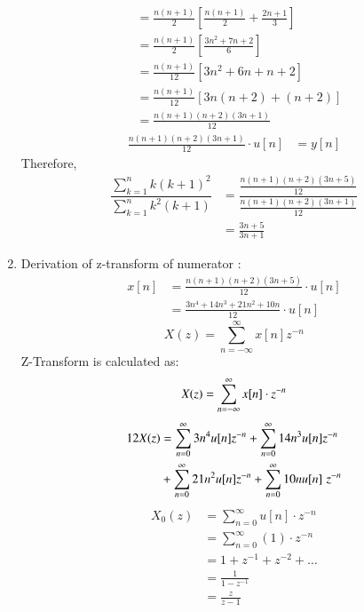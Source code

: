 \documentclass[journal,12pt,twocolumn]{IEEEtran}
\theoremstyle{remark}
\begin{document}
\begin{enumerate}[label=\alph*)]
\begin{align*}
                           &= \frac{n(n+1)}{2}\left[\frac{n(n+1)}{2} +\frac{2n+1}{3}\right]\\
                           &= \frac{n(n+1)}{2}\left[\frac{3n^2+7n+2}{6}\right]\\
                           &= \frac{n(n+1)}{12}\left[3n^2+6n + n+2\right]\\
                           &= \frac{n(n+1)}{12}\left[3n(n+2)+(n+2)\right]\\
                           &= \frac{n(n+1)(n+2)(3n+1)}{12}
\end{align*}
\begin{align*}
    \frac{n(n+1)(n+2)(3n+1)}{12}\cdot u[n] &= y[n]
\end{align*}
\vspace{1cm}
Therefore,
\begin{align*}
     \dfrac{ \sum_{k=1}^n k(k+1)^2 }{\sum_{k=1}^n k^2(k+1)} &= \dfrac{\frac{n(n+1)(n+2)(3n+5)}{12}}{\frac{n(n+1)(n+2)(3n+1)}{12}}\\
                                                            &= \frac{3n+5}{3n+1}
\end{align*}
\vspace{0.7cm}


\newpage

    \item Derivation of z-transform of numerator :
\begin{align*}
    x[n] &= \frac{n(n+1)(n+2)(3n+5)}{12}\cdot u[n]\\
         &= \frac{3n^4 + 14n^3 + 21n^2 + 10n}{12}\cdot u[n]\
\end{align*}
\begin{equation}
    X(z) = \sum_{n=-\infty}^\infty x[n]z^{-n}
\end{equation}
Z-Transform is calculated as:
\begin{equation}
    X(z) = \sum_{n=-\infty}^\infty x[n]\cdot z^{-n}\notag
\end{equation}
\begin{align}
    12X(z) &= \sum_{n=0}^\infty 3n^4u[n]z^{-n} +  \sum_{n=0}^\infty 14n^3u[n]z^{-n} \\ &+  \sum_{n=0}^\infty 21n^2u[n] z^{-n} +\sum_{n=0}^\infty 10nu[n]\hspace{3pt} z^{-n}\notag
\end{align}
    \begin{align*}
X_0(z) &= \sum_{n=0}^{\infty} u[n]\cdot z^{-n} \\
     &= \sum_{n=0}^{\infty} (1) \cdot z^{-n} \\
     &= 1 + z^{-1} + z^{-2} + \ldots \\
     &= \frac{1}{1 - z^{-1}} \\
     &= \frac{z}{z - 1}
\end{align*}


\end{enumerate}
\end{document}
